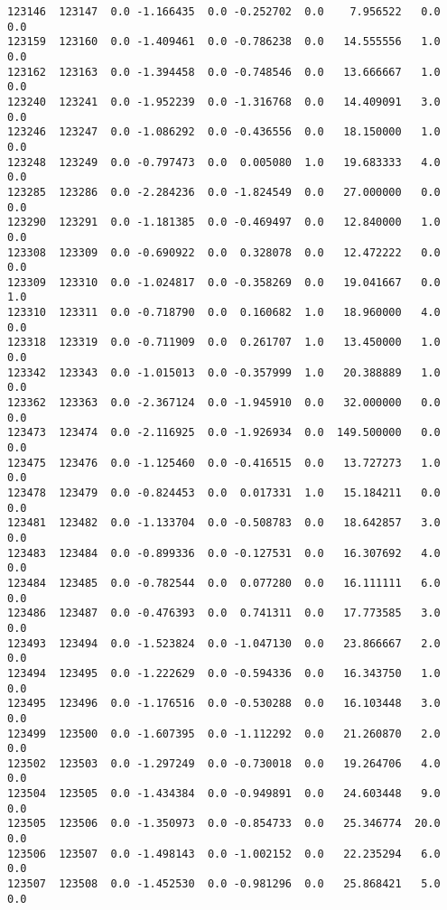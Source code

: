 \documentclass[11pt]{article}
\begin{document}
\begin{Verbatim}[commandchars=\\\{\}]
123146  123147  0.0 -1.166435  0.0 -0.252702  0.0    7.956522   0.0   0.0   
123159  123160  0.0 -1.409461  0.0 -0.786238  0.0   14.555556   1.0   0.0   
123162  123163  0.0 -1.394458  0.0 -0.748546  0.0   13.666667   1.0   0.0   
123240  123241  0.0 -1.952239  0.0 -1.316768  0.0   14.409091   3.0   0.0   
123246  123247  0.0 -1.086292  0.0 -0.436556  0.0   18.150000   1.0   0.0   
123248  123249  0.0 -0.797473  0.0  0.005080  1.0   19.683333   4.0   0.0   
123285  123286  0.0 -2.284236  0.0 -1.824549  0.0   27.000000   0.0   0.0   
123290  123291  0.0 -1.181385  0.0 -0.469497  0.0   12.840000   1.0   0.0   
123308  123309  0.0 -0.690922  0.0  0.328078  0.0   12.472222   0.0   0.0   
123309  123310  0.0 -1.024817  0.0 -0.358269  0.0   19.041667   0.0   1.0   
123310  123311  0.0 -0.718790  0.0  0.160682  1.0   18.960000   4.0   0.0   
123318  123319  0.0 -0.711909  0.0  0.261707  1.0   13.450000   1.0   0.0   
123342  123343  0.0 -1.015013  0.0 -0.357999  1.0   20.388889   1.0   0.0   
123362  123363  0.0 -2.367124  0.0 -1.945910  0.0   32.000000   0.0   0.0   
123473  123474  0.0 -2.116925  0.0 -1.926934  0.0  149.500000   0.0   0.0   
123475  123476  0.0 -1.125460  0.0 -0.416515  0.0   13.727273   1.0   0.0   
123478  123479  0.0 -0.824453  0.0  0.017331  1.0   15.184211   0.0   0.0   
123481  123482  0.0 -1.133704  0.0 -0.508783  0.0   18.642857   3.0   0.0   
123483  123484  0.0 -0.899336  0.0 -0.127531  0.0   16.307692   4.0   0.0   
123484  123485  0.0 -0.782544  0.0  0.077280  0.0   16.111111   6.0   0.0   
123486  123487  0.0 -0.476393  0.0  0.741311  0.0   17.773585   3.0   0.0   
123493  123494  0.0 -1.523824  0.0 -1.047130  0.0   23.866667   2.0   0.0   
123494  123495  0.0 -1.222629  0.0 -0.594336  0.0   16.343750   1.0   0.0   
123495  123496  0.0 -1.176516  0.0 -0.530288  0.0   16.103448   3.0   0.0   
123499  123500  0.0 -1.607395  0.0 -1.112292  0.0   21.260870   2.0   0.0   
123502  123503  0.0 -1.297249  0.0 -0.730018  0.0   19.264706   4.0   0.0   
123504  123505  0.0 -1.434384  0.0 -0.949891  0.0   24.603448   9.0   0.0   
123505  123506  0.0 -1.350973  0.0 -0.854733  0.0   25.346774  20.0   0.0   
123506  123507  0.0 -1.498143  0.0 -1.002152  0.0   22.235294   6.0   0.0   
123507  123508  0.0 -1.452530  0.0 -0.981296  0.0   25.868421   5.0   0.0   


\end{Verbatim}
\end{document}
